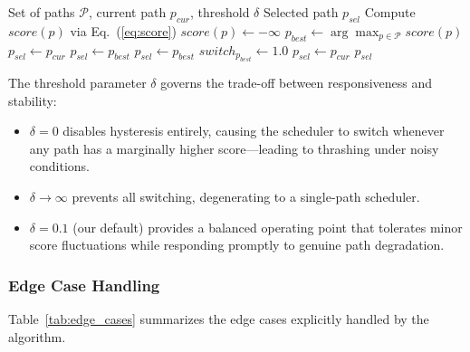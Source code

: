 \documentclass[conference,10pt]{IEEEtran}
\begin{document}
\begin{algorithm}[t]
\caption{QUIC-Flex Hysteresis-Gated Path Decision}
\label{alg:decision}
\begin{algorithmic}[1]
\REQUIRE Set of paths $\mathcal{P}$, current path $p_{cur}$, threshold $\delta$
\ENSURE Selected path $p_{sel}$
    \STATE Compute $score(p)$ via Eq.~(\ref{eq:score})
        \STATE $score(p) \leftarrow -\infty$ 
    \ENDIF
\ENDFOR
\STATE $p_{best} \leftarrow \arg\max_{p \in \mathcal{P}} score(p)$
    \STATE $p_{sel} \leftarrow p_{cur}$ 
    \STATE $p_{sel} \leftarrow p_{best}$ 
    \STATE $p_{sel} \leftarrow p_{best}$ 
    \STATE $switch_{p_{best}} \leftarrow 1.0$ 
\ELSE
    \STATE $p_{sel} \leftarrow p_{cur}$ 
\ENDIF
\RETURN $p_{sel}$
\end{algorithmic}
\end{algorithm}

The threshold parameter $\delta$ governs the trade-off between responsiveness and stability:
\begin{itemize}
    \item \textbf{$\delta = 0$} disables hysteresis entirely, causing the scheduler to switch whenever any path has a marginally higher score—leading to thrashing under noisy conditions.
    \item \textbf{$\delta \to \infty$} prevents all switching, degenerating to a single-path scheduler.
    \item \textbf{$\delta = 0.1$} (our default) provides a balanced operating point that tolerates minor score fluctuations while responding promptly to genuine path degradation.
\end{itemize}

\subsubsection{Edge Case Handling}

Table~\ref{tab:edge_cases} summarizes the edge cases explicitly handled by the algorithm.
\end{document}
